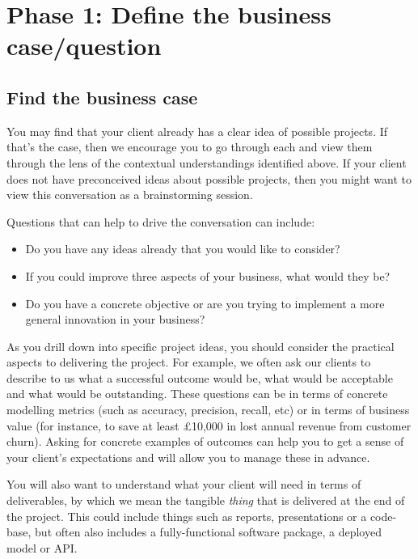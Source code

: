 \documentclass[]{book}
\providecommand{\tightlist}{%
  \setlength{\itemsep}{0pt}\setlength{\parskip}{0pt}}
\begin{document}
\hypertarget{phase-1-define-the-business-casequestion}{%
\section{Phase 1: Define the business
case/question}\label{phase-1-define-the-business-casequestion}}

\hypertarget{find-the-business-case}{%
\subsection{Find the business case}\label{find-the-business-case}}

You may find that your client already has a clear idea of possible
projects. If that's the case, then we encourage you to go through each
and view them through the lens of the contextual understandings
identified above. If your client does not have preconceived ideas about
possible projects, then you might want to view this conversation as a
brainstorming session.

Questions that can help to drive the conversation can include:

\begin{itemize}
\tightlist
\item
  Do you have any ideas already that you would like to consider?
\item
  If you could improve three aspects of your business, what would they
  be?
\item
  Do you have a concrete objective or are you trying to implement a more
  general innovation in your business?
\end{itemize}

As you drill down into specific project ideas, you should consider the
practical aspects to delivering the project. For example, we often ask
our clients to describe to us what a successful outcome would be, what
would be acceptable and what would be outstanding. These questions can
be in terms of concrete modelling metrics (such as accuracy, precision,
recall, etc) or in terms of business value (for instance, to save at
least £10,000 in lost annual revenue from customer churn). Asking for
concrete examples of outcomes can help you to get a sense of your
client's expectations and will allow you to manage these in advance.

You will also want to understand what your client will need in terms of
deliverables, by which we mean the tangible \emph{thing} that is
delivered at the end of the project. This could include things such as
reports, presentations or a code-base, but often also includes a
fully-functional software package, a deployed model or API.
\end{document}
